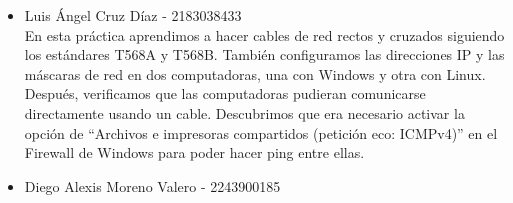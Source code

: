     \begin{itemize}
    \item Luis Ángel Cruz Díaz - 2183038433\\
        En esta práctica aprendimos a hacer cables de red rectos y cruzados siguiendo los estándares T568A y T568B. También configuramos las direcciones IP y las máscaras de red en dos computadoras, una con Windows y otra con Linux. Después, verificamos que las computadoras pudieran comunicarse directamente usando un cable. Descubrimos que era necesario activar la opción de ``Archivos e impresoras compartidos (petición eco: ICMPv4)'' en el Firewall de Windows para poder hacer ping entre ellas.
    \item Diego Alexis Moreno Valero - 2243900185\\
    \end{itemize}

